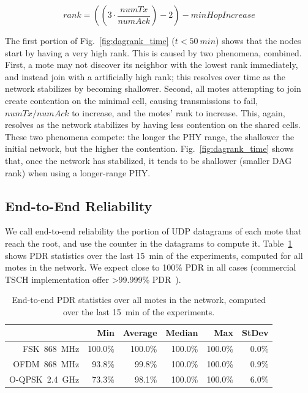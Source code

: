 \documentclass[sensors,article,submit,moreauthors,pdftex]{Definitions/mdpi}
\newcommand{\fsk}           {FSK~868~MHz}
\newcommand{\oqpsk}         {O-QPSK~2.4~GHz}
\newcommand{\ofdm}          {OFDM~868~MHz}
\begin{document}
\begin{equation}
    rank = ((3 \cdot \frac{numTx}{numAck})-2)-minHopIncrease
    \label{eq:rank}
\end{equation}

The first portion of Fig.~\ref{fig:dagrank_time} ($t<50~min$) shows that the nodes start by having a very high rank.
This is caused by two phenomena, combined.
First, a mote may not discover its neighbor with the lowest rank immediately, and instead join with a artificially high rank; this resolves over time as the network stabilizes by becoming shallower.
Second, all motes attempting to join create contention on the minimal cell, causing
    transmissions to fail,
    $numTx/numAck$ to increase, and
    the motes' rank to increase.
This, again, resolves as the network stabilizes by having less contention on the shared cells.
These two phenomena compete: the longer the PHY range, the shallower the initial network, but the higher the contention.
Fig.~\ref{fig:dagrank_time} shows that, once the network has stabilized, it tends to be shallower (smaller DAG rank) when using a longer-range PHY.

\subsection{End-to-End Reliability}
\label{sec:res_reliability}


We call end-to-end reliability the portion of UDP datagrams of each mote that reach the root, and use the counter in the datagrams to compute it.
Table~\ref{tab:pdr_table} shows PDR statistics over the last 15~min of the experiments, computed for all motes in the network.
We expect close to 100\% PDR in all cases (commercial TSCH implementation offer >99.999\% PDR~\cite{vucinic20key}).

\begin{table}
    \centering
    \begin{tabular}{|r|r|r|r|r|r|}
        \hline
                &      Min &  Average &   Median &      Max &  StDev \\ \hline
        \fsk    &  100.0\% &  100.0\% &  100.0\% &  100.0\% &  0.0\% \\ \hline
        \ofdm   &   93.8\% &   99.8\% &  100.0\% &  100.0\% &  0.9\% \\ \hline
        \oqpsk  &   73.3\% &   98.1\% &  100.0\% &  100.0\% &  6.0\% \\ \hline
    \end{tabular}
    \caption{End-to-end PDR statistics over all motes in the network, computed over the last 15~min of the experiments.}
    \label{tab:pdr_table}
\end{table}
\end{document}
